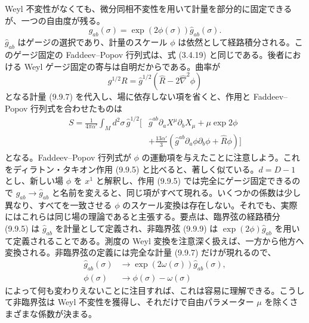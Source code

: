 Weyl 不変性がなくても、微分同相不変性を用いて計量を部分的に固定できるが、一つの自由度が残る。
\begin{equation}
g_{ab}(\sigma)=\exp(2\phi(\sigma))\widehat g_{ab}(\sigma).
\tag{9.9.7}\label{eq:9.9.7}
\end{equation}
$\widehat g_{ab}$ はゲージの選択であり、計量のスケール $\phi$ は依然として経路積分される。このゲージ固定の Faddeev--Popov 行列式は、式 (3.4.19) と同じである。後者における Weyl ゲージ固定の寄与は自明だからである。曲率が
\begin{equation}
g^{1/2}R=\widehat g^{1/2}
\left(\widehat R-2\widehat\nabla^2\phi\right)
\tag{9.9.8}\label{eq:9.9.8}
\end{equation}
となる計量 (9.9.7) を代入し、場に依存しない項を省くと、作用と Faddeev--Popov 行列式を合わせたものは
\begin{equation}
\begin{split}
S=\frac1{4\pi\alpha'}\int_M d^2\sigma\,\widehat g^{1/2}
\biggl[&
\widehat g^{ab}\partial_aX^\mu\partial_bX_\mu+\mu\exp2\phi\\
&+\frac{13\alpha'}3
\left(\widehat g^{ab}\partial_a\phi\partial_b\phi+\widehat R\phi\right)
\biggr]
\end{split}
\tag{9.9.9}\label{eq:9.9.9}
\end{equation}
となる。Faddeev--Popov 行列式が $\phi$ の運動項を与えたことに注意しよう。これをディラトン・タキオン作用 (9.9.5) と比べると、著しく似ている。$d=D-1$ とし、新しい場 $\phi$ を $x^1$ と解釈し、作用 (9.9.5) では完全にゲージ固定できるので $g_{ab}\to\widehat g_{ab}$ と名前を変えると、同じ項がすべて現れる。いくつかの係数は少し異なり、すべてを一致させる $\phi$ のスケール変換は存在しない。それでも、実際にはこれらは同じ場の理論であると主張する。要点は、臨界弦の経路積分 (9.9.5) は $\widehat g_{ab}$ を計量として定義され、非臨界弦 (9.9.9) は $\exp(2\phi)\widehat g_{ab}$ を用いて定義されることである。測度の Weyl 変換を注意深く扱えば、一方から他方へ変換される。非臨界弦の定義には完全な計量 (9.9.7) だけが現れるので、
\begin{align}
\widehat g_{ab}(\sigma)&\longrightarrow
\exp(2\omega(\sigma))\widehat g_{ab}(\sigma),
\tag{9.9.10a}\label{eq:9.9.10a}\\
\phi(\sigma)&\longrightarrow\phi(\sigma)-\omega(\sigma)
\tag{9.9.10b}\label{eq:9.9.10b}
\end{align}
によって何も変わりえないことに注目すれば、これは容易に理解できる。こうして非臨界弦は Weyl 不変性を獲得し、それだけで自由パラメーター $\mu$ を除くさまざまな係数が決まる。

